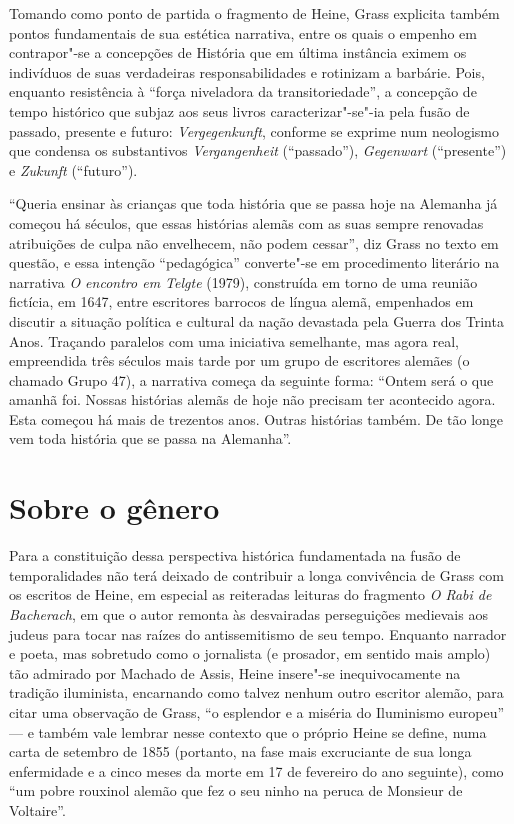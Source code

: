 Tomando como ponto de partida o fragmento de Heine, Grass explicita
também pontos fundamentais de sua estética narrativa, entre os quais o
empenho em contrapor"-se a concepções de História que em última
instância eximem os indivíduos de suas verdadeiras responsabilidades e
rotinizam a barbárie. Pois, enquanto resistência à “força niveladora da
transitoriedade”, a concepção de tempo histórico que subjaz aos seus
livros caracterizar"-se"-ia pela fusão de passado, presente e
futuro: \textit{Vergegenkunft}, conforme se exprime num neologismo que
condensa os substantivos \textit{Vergangenheit} (“passado”),
\textit{Gegenwart} (“presente”) e \textit{Zukunft} (“futuro”).

“Queria ensinar às crianças que toda história que se passa hoje na
Alemanha já começou há séculos, que essas histórias alemãs com as suas
sempre renovadas atribuições de culpa não envelhecem, não podem
cessar”, diz Grass no texto em questão, e essa intenção “pedagógica”
converte"-se em procedimento literário na narrativa \textit{O encontro
em Telgte} (1979), construída em torno de uma reunião fictícia, em
1647, entre escritores barrocos de língua alemã, empenhados em discutir
a situação política e cultural da nação devastada pela Guerra dos
Trinta Anos. Traçando paralelos com uma iniciativa semelhante, mas
agora real, empreendida três séculos mais tarde por um grupo de
escritores alemães (o chamado Grupo 47), a narrativa começa da seguinte
forma: “Ontem será o que amanhã foi. Nossas histórias alemãs de hoje
não precisam ter acontecido agora. Esta começou há mais de trezentos
anos. Outras histórias também. De tão longe vem toda história que se
passa na Alemanha”.

\section{Sobre o gênero} %

 Para a constituição dessa perspectiva histórica fundamentada na fusão
de temporalidades não terá deixado de contribuir a longa convivência de
Grass com os escritos de Heine, em especial as reiteradas leituras do
fragmento \textit{O Rabi de Bacherach}, em que o autor remonta às
desvairadas perseguições medievais aos judeus para tocar nas raízes do
antissemitismo de seu tempo. Enquanto narrador e poeta, mas sobretudo
como o jornalista (e prosador, em sentido mais amplo) tão admirado por
Machado de Assis, Heine insere"-se inequivocamente na tradição
iluminista, encarnando como talvez nenhum outro escritor alemão, para
citar uma observação de Grass, “o esplendor e a miséria do Iluminismo
europeu” --- e também vale lembrar nesse contexto que o próprio Heine se
define, numa carta de setembro de 1855 (portanto, na fase mais
excruciante de sua longa enfermidade e a cinco meses da morte em 17 de
fevereiro do ano seguinte), como “um pobre rouxinol alemão que fez o
seu ninho na peruca de Monsieur de Voltaire”.

